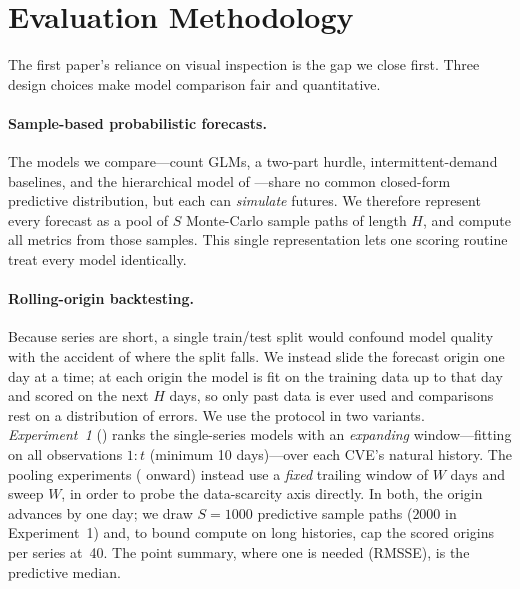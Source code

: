 \documentclass[]{article}
\begin{document}
\section{Evaluation Methodology}\label{sec:eval}
The first paper's reliance on visual inspection is the gap we close first. Three
design choices make model comparison fair and quantitative.

\paragraph{Sample-based probabilistic forecasts.} The models we compare---count
GLMs, a two-part hurdle, intermittent-demand baselines, and the hierarchical model
of ---share no common closed-form predictive distribution, but
each can \emph{simulate} futures. We therefore represent every forecast as a pool
of $S$ Monte-Carlo sample paths of length $H$, and compute all metrics from those
samples. This single representation lets one scoring routine treat every model
identically.

\paragraph{Rolling-origin backtesting.} Because series are short, a single
train/test split would confound model quality with the accident of where the split
falls. We instead slide the forecast origin one day at a time; at each origin the
model is fit on the training data up to that day and scored on the next $H$ days,
so only past data is ever used and comparisons rest on a distribution of errors.
We use the protocol in two variants. \emph{Experiment~1} () ranks
the single-series models with an \emph{expanding} window---fitting on all
observations $1{:}t$ (minimum 10 days)---over each CVE's natural history. The
pooling experiments ( onward) instead use a \emph{fixed} trailing
window of $W$ days and sweep $W$, in order to probe the data-scarcity axis directly.
In both, the origin advances by one day; we draw $S=1000$ predictive sample paths
($2000$ in Experiment~1) and, to bound compute on long histories, cap the scored
origins per series at~40. The point summary, where one is needed (RMSSE), is the
predictive median.
\end{document}
